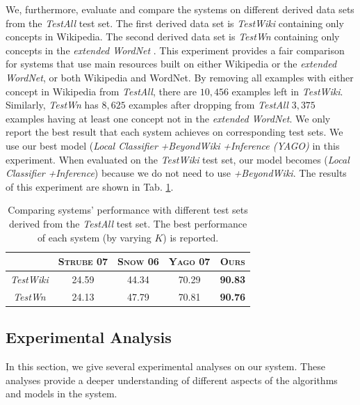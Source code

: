 We, furthermore, evaluate and compare the systems on different derived
data sets from the {\em TestAll} test set. The first derived data set
is {\em TestWiki} containing only concepts in Wikipedia. The second
derived data set is {\em TestWn} containing only concepts in the {\em
  extended WordNet} \cite{ilprints665,Snow2006}. This experiment
provides a fair comparison for systems that use main resources built
on either Wikipedia or the {\em extended WordNet}, or both Wikipedia
and WordNet. By removing all examples with either concept in Wikipedia
from {\em TestAll}, there are $10,456$ examples left in {\em
  TestWiki}. Similarly, {\em TestWn} has $8,625$ examples after
dropping from {\em TestAll} $3,375$ examples having at least one
concept not in the {\em extended WordNet}. We only report the best
result that each system achieves on corresponding test sets. We use our
best model ({\em Local Classifier} {\em +BeyondWiki} {\em +Inference
  (YAGO)} in this experiment. When evaluated on the {\em TestWiki}
test set, our model becomes ({\em Local Classifier} {\em +Inference})
because we do not need to use {\em +BeyondWiki}. The results of this
experiment are shown in Tab. \ref{table:exp-diff-test}.

\begin{table}[h]
  \begin{center}
    \begin{tabular}{|c||c|c|c|c|}
      \hline
      &  \textsc{Strube 07}  &  \textsc{Snow 06}  &  \textsc{Yago 07}  &  \textsc{Ours}   \\
      \hline
      {\em TestWiki}  &               24.59  &             44.34  &             70.29  &  \textbf{90.83}  \\
      {\em TestWn}    &               24.13  &             47.79  &             70.81  &  \textbf{90.76}  \\
      \hline
    \end{tabular}
    \caption{Comparing systems' performance with different test sets
      derived from the {\em TestAll} test set. The best performance of
      each system (by varying $K$) is reported.}
    \label{table:exp-diff-test}
  \end{center}
\end{table}

\subsection{Experimental Analysis}

In this section, we give several experimental analyses on our system.
These analyses provide a deeper understanding of different aspects of the
algorithms and models in the system.

